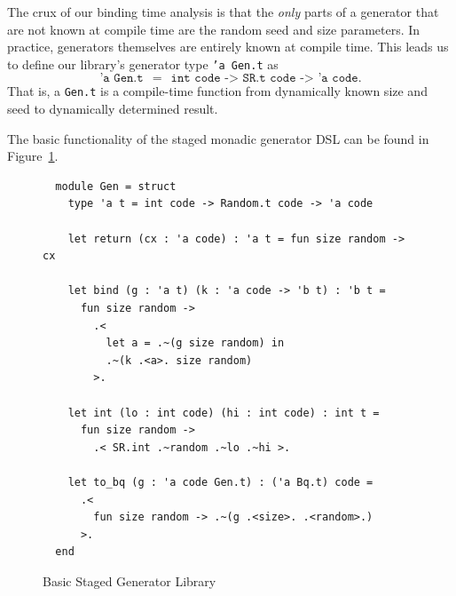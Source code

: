 \documentclass[acmsmall]{acmart}
\newif\ifaftersubmission\aftersubmissionfalse{}
\theoremstyle{definition}
\begin{document}

The crux of our binding time analysis is that the \emph{only} parts of a
generator that are not
known at compile time are the random seed and
size parameters. In practice, generators themselves are entirely known at compile time.
This leads us to define our library's generator type \texttt{'a
  Gen.t} as
\[
\texttt{'a Gen.t} \ \ = \ \  \texttt{int code -> SR.t code -> 'a code}.
\]
That is, a \texttt{Gen.t} is a compile-time
function from dynamically known size and seed to dynamically determined result. 

The basic functionality of the staged monadic generator DSL can be
found in Figure~\ref{fig:gen-staged-basic}.

\begin{figure}[h]
  \begin{lstlisting}
  module Gen = struct
    type 'a t = int code -> Random.t code -> 'a code

    let return (cx : 'a code) : 'a t = fun size random -> cx

    let bind (g : 'a t) (k : 'a code -> 'b t) : 'b t =
      fun size random ->
        .<
          let a = .~(g size random) in
          .~(k .<a>. size random)
        >.

    let int (lo : int code) (hi : int code) : int t =
      fun size random ->
        .< SR.int .~random .~lo .~hi >.

    let to_bq (g : 'a code Gen.t) : ('a Bq.t) code =
      .<
        fun size random -> .~(g .<size>. .<random>.)
      >.
  end
  \end{lstlisting}
  \caption{Basic Staged Generator Library\ifaftersubmission\bcp{We could
      save some space if needed by eliminating a couple of linebreaks
      here.}\fi}
  \label{fig:gen-staged-basic}
  \end{figure}
\end{document}
